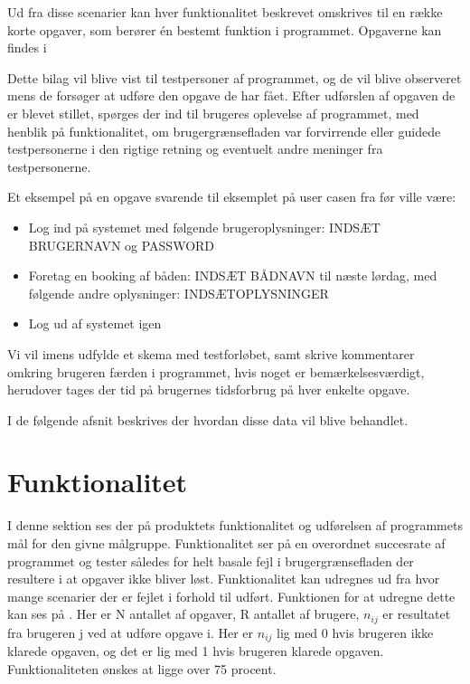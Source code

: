 Ud fra disse scenarier kan hver funktionalitet beskrevet omskrives til en række korte opgaver, som berører én bestemt funktion i programmet. Opgaverne kan findes i 

Dette bilag vil blive vist til testpersoner af programmet, og de vil blive observeret mens de forsøger at udføre den opgave de har fået. Efter udførslen af opgaven de er blevet stillet, spørges der ind til brugeres oplevelse af programmet, med henblik på funktionalitet, om brugergrænsefladen var forvirrende eller guidede testpersonerne i den rigtige retning og eventuelt andre meninger fra testpersonerne.

Et eksempel på en opgave svarende til eksemplet på user casen fra før ville være:

\begin{itemize}
\item Log ind på systemet med følgende brugeroplysninger: INDSÆT BRUGERNAVN og PASSWORD
\item Foretag en booking af båden: INDSÆT BÅDNAVN til næste lørdag, med følgende andre oplysninger: INDSÆTOPLYSNINGER
\item Log ud af systemet igen
\end{itemize}

Vi vil imens udfylde et skema med testforløbet, samt skrive kommentarer omkring brugeren færden i programmet, hvis noget er bemærkelsesværdigt, herudover tages der tid på brugernes tidsforbrug på hver enkelte opgave.

I de følgende afsnit beskrives der hvordan disse data vil blive behandlet.


\section{Funktionalitet}
I denne sektion ses der på produktets funktionalitet og udførelsen af programmets mål for den givne målgruppe. Funktionalitet ser på en overordnet succesrate af programmet og tester således for helt basale fejl i brugergrænsefladen der resultere i at opgaver ikke bliver løst. Funktionalitet kan udregnes ud fra hvor mange scenarier der er fejlet i forhold til udført. Funktionen for at udregne dette kan ses på . Her er N antallet af opgaver, R antallet af brugere, $n_{ij}$ er resultatet fra brugeren j ved at udføre opgave i. Her er $n_{ij}$ lig med 0 hvis brugeren ikke klarede opgaven, og det er lig med 1 hvis brugeren klarede opgaven. Funktionaliteten ønskes at ligge over 75 procent.\citep{UIEffectiveness}


